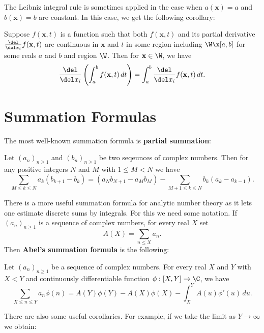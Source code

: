     The Leibniz integral rule is sometimes applied in the case when $a(\mathbf{x}) = a$ and $b(\mathbf{x}) = b$ are constant. In this case, we get the following corollary:

    \begin{corollary}
      Suppose $f(\mathbf{x},t)$ is a function such that both $f(\mathbf{x},t)$ and its partial derivative $\frac{\del}{\del x_{i}}f(\mathbf{x},t)$ are continuous in $\mathbf{x}$ and $t$ in some region including $\W \x [a,b]$ for some reals $a$ and $b$ and region $\W$. Then for $\mathbf{x} \in \W$, we have
      \[
        \frac{\del}{\del x_{i}}\left(\int_{a}^{b}f(\mathbf{x},t)\,dt\right) = \int_{a}^{b}\frac{\del}{\del x_{i}}f(\mathbf{x},t)\,dt.
      \]
    \end{corollary}
  \section{Summation Formulas}\label{append:Summation_Formulas}
    The most well-known summation formula is \textbf{partial summation}:

    \begin{theorem}\label{thm:partial_summation}
      Let $(a_{n})_{n \ge 1}$ and $(b_{n})_{n \ge 1}$ be two seqeunces of complex numbers. Then for any positive integers $N$ and $M$ with $1 \le M < N$ we have
      \[
        \sum_{M \le k \le N}a_{k}(b_{k+1}-b_{k}) = (a_{N}b_{N+1}-a_{M}b_{M})-\sum_{M+1 \le k \le N}b_{k}(a_{k}-a_{k-1}).
      \]
    \end{theorem}
    
    There is a more useful summation formula for analytic number theory as it lets one estimate discrete sums by integrals. For this we need some notation. If $(a_{n})_{n \ge 1}$ is a sequence of complex numbers, for every real $X$ set
    \[
        A(X) = \sum_{n \le X}a_{n}.
    \]
    Then \textbf{Abel's summation formula} is the following:

    \begin{theorem}
      Let $(a_{n})_{n \ge 1}$ be a sequence of complex numbers. For every real $X$ and $Y$ with $X < Y$ and continuously differentiable function $\phi:[X,Y] \to \C$, we have
      \[
        \sum_{X \le n \le Y}a_{n}\phi(n) = A(Y)\phi(Y)-A(X)\phi(X)-\int_{X}^{Y}A(u)\phi'(u)\,du.
      \]
    \end{theorem}

    There are also some useful corollaries. For example, if we take the limit as $Y \to \infty$ we obtain:


